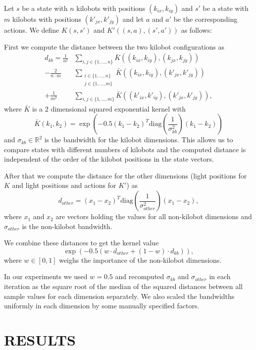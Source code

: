 \documentclass[twoside]{article}
\begin{document}
Let $s$ be a state with $n$ kilobots with positions $(k_{ix}, k_{iy})$
and $s'$ be a state with $m$ kilobots with positions $(k'_{jx}, k'_{jy})$ and
let $a$ and $a'$ be the corresponding actions.
We define $K(s, s')$ and $K'((s, a), (s', a'))$ as follows:

First we compute the distance between the two kilobot configurations as
\begin{align*}
d_{kb} =
  \frac{1}{n^2} &\sum_{i,j \in \{1,\dots,n\}}
    \bar{K}((k_{ix}, k_{iy}), (k_{jx}, k_{jy})) \\
- \frac{2}{n \cdot m} &\sum_{\substack{i \in \{1,\dots,n\}\\j \in \{1,\dots,m\}}}
    \bar{K}((k_{ix}, k_{iy}), (k'_{jx}, k'_{jy})) \\
+ \frac{1}{m^2} &\sum_{i,j \in \{1,\dots,m\}}
    \bar{K}((k'_{ix}, k'_{iy}), (k'_{jx}, k'_{jy})),
\end{align*}
where $\bar{K}$ is a 2 dimensional squared exponential kernel with
$$
\bar{K}(k_1, k_2) =
    \exp \left(-0.5 (k_1 - k_2)^T
    \mathrm{diag}\left(\frac{1}{\sigma_{kb}^2}\right) (k_1 - k_2)\right)
$$
and $\sigma_{kb} \in \mathbb{R}^2$ is the bandwidth for the kilobot dimensions.
This allows us to compare states with different numbers of kilobots and the
computed distance is independent of the order of the kilobot positions in the
state vectors.

After that we compute the distance for the other dimensions (light positions for
$K$ and light positions and actions for $K'$) as
$$
d_{other} = (x_1 - x_2)^T \mathrm{diag}\left(\frac{1}{\sigma_{other}^2}\right) (x_1 - x_2),
$$
where $x_1$ and $x_2$ are vectors holding the values for all non-kilobot
dimensions and $\sigma_{other}$ is the non-kilobot bandwidth.

We combine these distances to get the kernel value
$$
\exp(-0.5 (w \cdot d_{other} + (1 - w) \cdot d_{kb})),
$$
where $w \in [0,1]$ weighs the importance of the non-kilobot dimensions.

In our experiments we used $w = 0.5$ and recomputed $\sigma_{kb}$ and
$\sigma_{other}$ in each iteration as the square root of the median of the
squared distances between all sample values for each dimension separately. We
also scaled the bandwidths uniformly in each dimension by some manually
specified factors.

\section{RESULTS}
\end{document}
